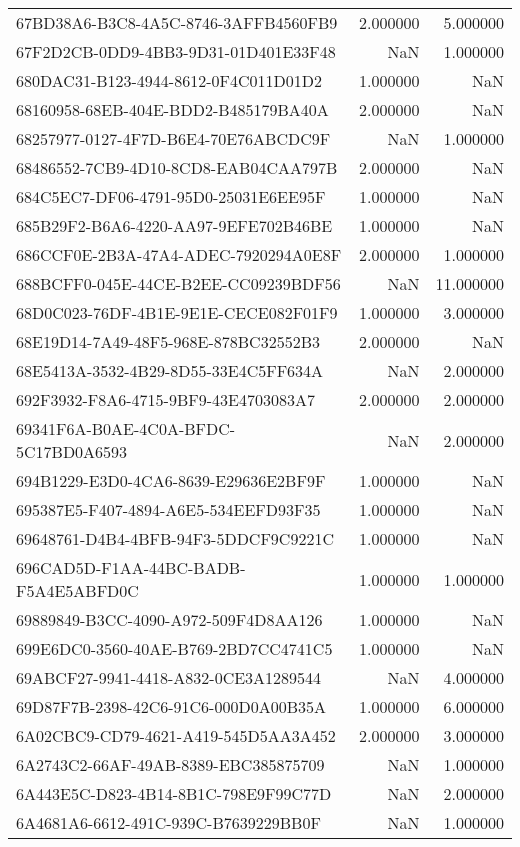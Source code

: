 \begin{tabular}{lrr}
67BD38A6-B3C8-4A5C-8746-3AFFB4560FB9 & 2.000000 & 5.000000 \\
67F2D2CB-0DD9-4BB3-9D31-01D401E33F48 & NaN & 1.000000 \\
680DAC31-B123-4944-8612-0F4C011D01D2 & 1.000000 & NaN \\
68160958-68EB-404E-BDD2-B485179BA40A & 2.000000 & NaN \\
68257977-0127-4F7D-B6E4-70E76ABCDC9F & NaN & 1.000000 \\
68486552-7CB9-4D10-8CD8-EAB04CAA797B & 2.000000 & NaN \\
684C5EC7-DF06-4791-95D0-25031E6EE95F & 1.000000 & NaN \\
685B29F2-B6A6-4220-AA97-9EFE702B46BE & 1.000000 & NaN \\
686CCF0E-2B3A-47A4-ADEC-7920294A0E8F & 2.000000 & 1.000000 \\
688BCFF0-045E-44CE-B2EE-CC09239BDF56 & NaN & 11.000000 \\
68D0C023-76DF-4B1E-9E1E-CECE082F01F9 & 1.000000 & 3.000000 \\
68E19D14-7A49-48F5-968E-878BC32552B3 & 2.000000 & NaN \\
68E5413A-3532-4B29-8D55-33E4C5FF634A & NaN & 2.000000 \\
692F3932-F8A6-4715-9BF9-43E4703083A7 & 2.000000 & 2.000000 \\
69341F6A-B0AE-4C0A-BFDC-5C17BD0A6593 & NaN & 2.000000 \\
694B1229-E3D0-4CA6-8639-E29636E2BF9F & 1.000000 & NaN \\
695387E5-F407-4894-A6E5-534EEFD93F35 & 1.000000 & NaN \\
69648761-D4B4-4BFB-94F3-5DDCF9C9221C & 1.000000 & NaN \\
696CAD5D-F1AA-44BC-BADB-F5A4E5ABFD0C & 1.000000 & 1.000000 \\
69889849-B3CC-4090-A972-509F4D8AA126 & 1.000000 & NaN \\
699E6DC0-3560-40AE-B769-2BD7CC4741C5 & 1.000000 & NaN \\
69ABCF27-9941-4418-A832-0CE3A1289544 & NaN & 4.000000 \\
69D87F7B-2398-42C6-91C6-000D0A00B35A & 1.000000 & 6.000000 \\
6A02CBC9-CD79-4621-A419-545D5AA3A452 & 2.000000 & 3.000000 \\
6A2743C2-66AF-49AB-8389-EBC385875709 & NaN & 1.000000 \\
6A443E5C-D823-4B14-8B1C-798E9F99C77D & NaN & 2.000000 \\
6A4681A6-6612-491C-939C-B7639229BB0F & NaN & 1.000000 \\

\end{tabular}
